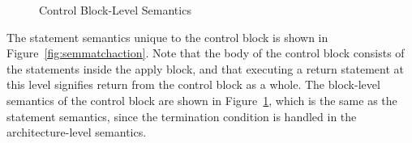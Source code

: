 \documentclass[UTF8]{article}
\begin{document}
\begin{figure}[ht!]
\ottdefnsctrlXXsem
\caption{Control Block-Level Semantics}
\label{fig:semctrl}
\end{figure}

The statement semantics unique to the control block is shown in Figure~\ref{fig:semmatchaction}. Note that the body of the control block consists of the statements inside the apply block, and that executing a return statement at this level signifies return from the control block as a whole. The block-level semantics of the control block are shown in Figure~\ref{fig:semctrl}, which is the same as the statement semantics, since the termination condition is handled in the architecture-level semantics.

\newcommand{\actx}{\ensuremath{\mathit{ctx}_\mathit{A}}}
\newcommand{\abl}{\ensuremath{\overline{ab}}}
\newcommand{\pbm}{\ensuremath{B_p}}
\newcommand{\ffbm}{\ensuremath{B_{ \mathit{ff}}}}
\newcommand{\aenv}{\ensuremath{\mathit{env}_\mathit{A}}}
\end{document}
